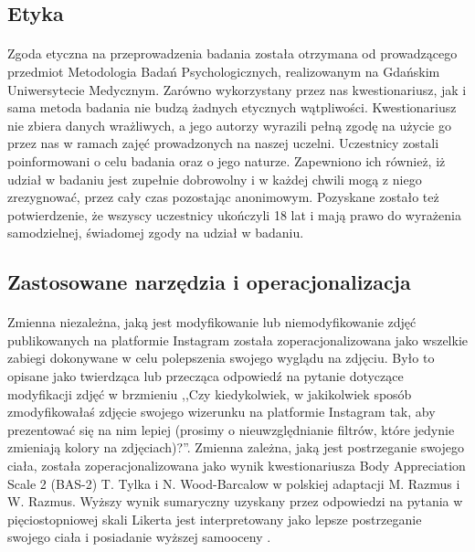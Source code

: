 \documentclass[12pt,a4paper,final,oneside,onecolumn,titlepage]{article}
\begin{document}
\subsection*{\normalsize{\textbf{Etyka}}}
\paragraph{}
Zgoda etyczna na przeprowadzenia badania została otrzymana od prowadzącego przedmiot Metodologia Badań Psychologicznych, realizowanym na Gdańskim Uniwersytecie Medycznym. Zarówno wykorzystany przez nas kwestionariusz, jak i sama metoda badania nie budzą żadnych etycznych wątpliwości. Kwestionariusz nie zbiera danych wrażliwych, a jego autorzy wyrazili pełną zgodę na użycie go przez nas w ramach zajęć prowadzonych na naszej uczelni. Uczestnicy zostali poinformowani o celu badania oraz o jego naturze. Zapewniono ich również, iż udział w badaniu jest zupełnie dobrowolny i w każdej chwili mogą z niego zrezygnować, przez cały czas pozostając anonimowym. Pozyskane zostało też potwierdzenie, że wszyscy uczestnicy ukończyli 18 lat i mają prawo do wyrażenia samodzielnej, świadomej zgody na udział w badaniu. 
\subsection*{\normalsize{\textbf{Zastosowane narzędzia i operacjonalizacja}}}
\paragraph{}
Zmienna niezależna, jaką jest modyfikowanie lub niemodyfikowanie zdjęć publikowanych na platformie Instagram została zoperacjonalizowana jako wszelkie zabiegi dokonywane w celu polepszenia swojego wyglądu na zdjęciu. Było to opisane jako twierdząca lub przecząca odpowiedź na pytanie dotyczące modyfikacji zdjęć w brzmieniu ,,Czy kiedykolwiek, w jakikolwiek sposób zmodyfikowałaś zdjęcie swojego wizerunku na platformie Instagram tak, aby prezentować się na nim lepiej (prosimy o nieuwzględnianie filtrów, które jedynie zmieniają kolory na zdjęciach)?''. Zmienna zależna, jaką jest postrzeganie swojego ciała, została zoperacjonalizowana jako wynik kwestionariusza Body Appreciation Scale 2 (BAS-2) T. Tylka i N. Wood-Barcalow w polskiej adaptacji M. Razmus i W. Razmus. Wyższy wynik sumaryczny uzyskany przez odpowiedzi na pytania w pięciostopniowej skali Likerta jest interpretowany jako lepsze postrzeganie swojego ciała i posiadanie wyższej samooceny \citep{razmus_evaluating_2017,tylka_body_2015}.
\end{document}
